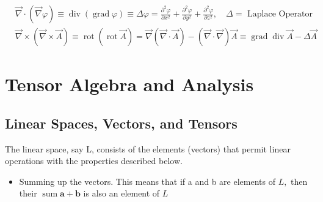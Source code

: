 \begin{equation}
\begin{aligned}
&\vec{\nabla} \cdot(\vec{\nabla} \varphi) \equiv \operatorname{div}(\operatorname{grad} \varphi) \equiv \Delta \varphi=\frac{\partial^{2} \varphi}{\partial x^{2}}+\frac{\partial^{2} \varphi}{\partial y^{2}}+\frac{\partial^{2} \varphi}{\partial z^{2}}, \quad \Delta=\text { Laplace Operator }\\
&\vec{\nabla} \times(\vec{\nabla} \times \vec{A}) \equiv \operatorname{rot}(\operatorname{rot} \vec{A})=\vec{\nabla}(\vec{\nabla} \cdot \vec{A})-(\vec{\nabla} \cdot \vec{\nabla}) \vec{A} \equiv \operatorname{grad} \operatorname{div} \vec{A}-\Delta \vec{A}
\end{aligned}
\end{equation}

\section{Tensor Algebra and Analysis}
\subsection{Linear Spaces, Vectors, and Tensors}
\begin{qt}
    The linear space, say L, consists of the elements (vectors) that permit linear operations with the properties described below.
    \begin{itemize}
        \item Summing up the vectors. This means that if a and b are elements of $L,$ then their $\operatorname{sum} \mathbf{a}+\mathbf{b}$ is also an element of $L$
    \end{itemize}
\end{qt}